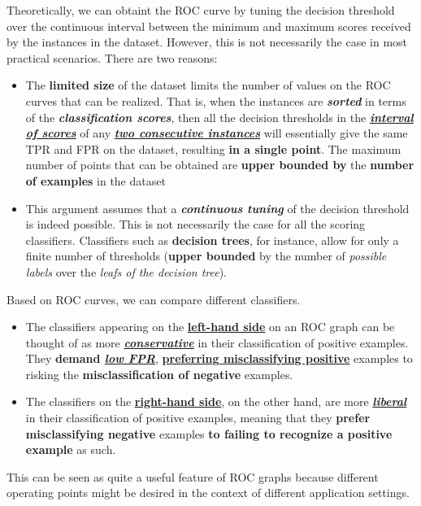 \documentclass[11pt]{article}
\begin{document}
Theoretically, we can obtaint the ROC curve by tuning the decision threshold over the continuous interval between the minimum and maximum scores received by the instances in the dataset. However, this is not necessarily the case in most practical scenarios. There are two reasons:
\begin{itemize}
\item The \textbf{limited size} of the dataset limits the number of values on the ROC curves that can be realized. That is, when the instances are \emph{\textbf{sorted}}
in terms of the \emph{\textbf{classification scores}}, then all the decision thresholds in the \underline{\emph{\textbf{interval of scores}}} of any \underline{\emph{\textbf{two consecutive instances}}} will essentially give the same TPR and FPR on the dataset, resulting \textbf{in a single point}. The maximum number of points that can be obtained are \textbf{upper bounded by} the \textbf{number of examples} in the dataset

\item This argument assumes that a \emph{\textbf{continuous tuning}} of the decision threshold is indeed possible. This is not necessarily the case for all the scoring classifiers. Classifiers such as \textbf{decision trees}, for instance, allow for only a finite number of thresholds (\textbf{upper bounded} by the number of \emph{possible labels} over the \emph{leafs of the decision tree}). 
\end{itemize}

Based on ROC curves, we can compare different classifiers.
\begin{itemize}
\item The classifiers appearing on the \underline{\textbf{left-hand side}} on an ROC graph can be thought of as more \underline{\emph{\textbf{conservative}}} in their classification of positive examples. They \textbf{demand \underline{\emph{low FPR}}},  \underline{\textbf{preferring misclassifying positive}} examples to risking the \textbf{misclassification of negative} examples.

\item The classifiers on the \underline{\textbf{right-hand side}}, on the other hand, are more \underline{\emph{\textbf{liberal}}} in their classification of positive examples, meaning that they \textbf{prefer misclassifying negative} examples \textbf{to failing to recognize a positive example} as such. 
\end{itemize} This can be seen as quite a useful feature of ROC graphs because different operating points might be desired in the context of different application settings.
\end{document}
